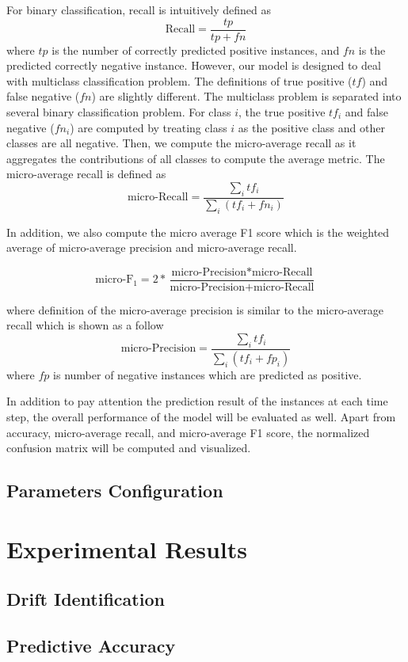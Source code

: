 For binary classification, recall is intuitively defined as 
\begin{equation}
\mbox{Recall} = \frac{tp}{tp+fn}
\end{equation}
where $tp$ is the number of correctly predicted positive instances, and $fn$ is the predicted correctly negative instance. However, our model is designed to deal with multiclass classification problem. The definitions of true positive ($tf$) and false negative ($fn$) are slightly different. The multiclass problem is separated into several binary classification problem. For class $i$, the true positive $tf_i$ and false negative ($fn_i$) are computed by treating class $i$ as the positive class and other classes are all negative. Then, we compute the micro-average recall as it aggregates the contributions of all classes to compute the average metric. The micro-average recall is defined as~\cite{sokolova2009systematic} 
\begin{equation}
\mbox{micro-Recall} = \frac{\sum_i tf_i}{\sum_i(tf_i + fn_i)}
\end{equation}

In addition, we also compute the micro average F1 score which is the weighted average of micro-average precision and micro-average recall.

\begin{equation}
\mbox{micro-F}_1 = 2 * \frac{\mbox{micro-Precision} * \mbox{micro-Recall}}{\mbox{micro-Precision} + \mbox{micro-Recall}}
\end{equation}

where definition of the micro-average precision is similar to the micro-average recall which is shown as a follow
\begin{equation}
\mbox{micro-Precision} = \frac{\sum_i tf_i}{\sum_i(tf_i + fp_i)}
\end{equation}
where $fp$ is number of negative instances which are predicted as positive.

In addition to pay attention the prediction result of the instances at each time step, the overall performance of the model will be evaluated as well. Apart from accuracy, micro-average recall, and micro-average F1 score, the normalized confusion matrix will be computed and visualized.

\subsection{Parameters Configuration}

\section{Experimental Results}
\subsection{Drift Identification}
\subsection{Predictive Accuracy}